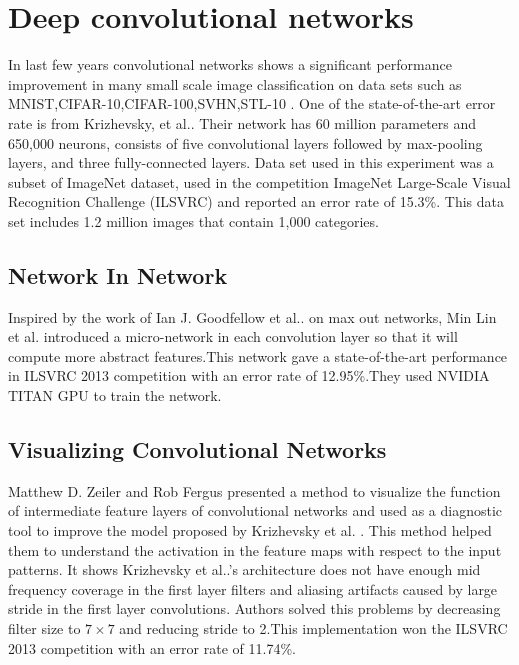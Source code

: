 \documentclass{article}
\begin{document}
\section {Deep convolutional networks}
In last few years convolutional networks shows a significant performance improvement in many small scale image classification on data sets  such as MNIST\cite{Ciresan:2012g},CIFAR-10,CIFAR-100,SVHN\cite{lee2014deeply},STL-10 \cite{deepfwd}. One of the state-of-the-art error rate is from Krizhevsky, et al.\cite{Krizhevsky2012a}. Their network has 60 million parameters and 650,000 neurons, consists of five convolutional layers followed by max-pooling layers, and three fully-connected layers. Data set used in this experiment was a subset of ImageNet dataset, used in the competition ImageNet Large-Scale Visual Recognition Challenge (ILSVRC)\cite{imagenet} and reported an error rate of 15.3\%. This data set includes 1.2 million images that contain 1,000 categories.







\subsection{Network In Network }
Inspired by the work of Ian J. Goodfellow et al..\cite{Goodfellow2013} on max out networks,  Min Lin et al. \cite{Lin2013} introduced a micro-network in each convolution layer so that it will compute more abstract features.This network gave a state-of-the-art performance in  ILSVRC 2013 competition with an error rate of 12.95\%.They used NVIDIA TITAN GPU to train the network.

\subsection{Visualizing Convolutional Networks}

Matthew D. Zeiler and Rob Fergus\cite{Zeiler2013} presented a method to visualize the function of intermediate feature layers of convolutional networks and used as a diagnostic tool to improve  the model proposed by Krizhevsky et al. \cite{Krizhevsky2012a}. This method helped  them  to understand  the activation in the feature maps with respect to the input patterns. It shows Krizhevsky et al..'s architecture does not have  enough mid frequency coverage in the first layer filters and aliasing artifacts caused by  large stride in the first layer convolutions. Authors solved this problems by decreasing filter size to $7\times7$ and reducing stride to 2.This implementation won the  ILSVRC 2013 competition with an error rate of 11.74\%.
\end{document}
